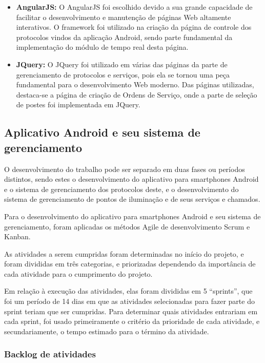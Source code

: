 \documentclass[
	article,			%
	11pt,				%
	oneside,			%
	a4paper,			%
	english,			%
	brazil,				%
	sumario=tradicional
	]{abntex2}
\begin{document}
\begin{itemize}
\item \textbf{AngularJS:} O AngularJS foi escolhido devido a sua grande capacidade de facilitar o desenvolvimento e manutenção de páginas Web altamente interativos.
O framework foi utilizado na criação da página de controle dos protocolos vindos da aplicação Android, sendo parte fundamental da implementação do módulo de tempo real desta página.

\item \textbf{JQuery:} O JQuery foi utilizado em várias das páginas da parte de gerenciamento de protocolos e serviços, pois ela se tornou uma peça fundamental para o desenvolvimento Web moderno.
Das páginas utilizadas, destaca-se a página de criação de Ordens de Serviço, onde a parte de seleção de postes foi implementada em JQuery.

\end{itemize}

\subsection{Aplicativo Android e seu sistema de gerenciamento}
O desenvolvimento do trabalho pode ser separado em duas fases ou períodos distintos, sendo estes o desenvolvimento do aplicativo para smartphones Android e o sistema de gerenciamento dos protocolos deste, e o desenvolvimento do sistema de gerenciamento de pontos de iluminação e de seus serviços e chamados.

Para o desenvolvimento do aplicativo para smartphones Android e seu sistema de gerenciamento, foram aplicadas os métodos Agile de desenvolvimento Scrum e Kanban.

As atividades a serem cumpridas foram determinadas no início do projeto, e foram divididas em três categorias, e priorizadas dependendo da importância de cada atividade para o cumprimento do projeto.

Em relação à execução das atividades, elas foram divididas em 5 “sprints”, que foi um período de 14 dias em que as atividades selecionadas para fazer parte do sprint teriam que ser cumpridas.
Para determinar quais atividades entrariam em cada sprint, foi usado primeiramente o critério da prioridade de cada atividade, e secundariamente, o tempo estimado para o término da atividade.

\subsubsection{Backlog de atividades}
\end{document}
